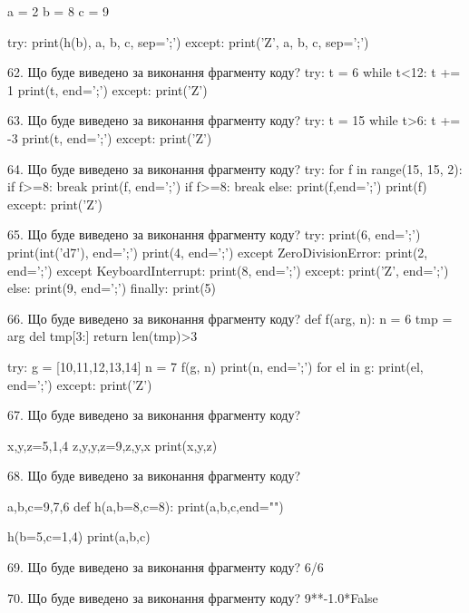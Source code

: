 \documentclass[11pt]{article}
\begin{document}
a = 2
b = 8
c = 9

try:
    print(h(b), a, b, c, sep=';')
except:
    print('Z', a, b, c, sep=';')


62. Що буде виведено за виконання фрагменту коду?
try:
    t = 6
    while t<12:
        t += 1
    print(t, end=';')
except:
    print('Z')


63. Що буде виведено за виконання фрагменту коду?
try:
    t = 15
    while t>6:
        t += -3
    print(t, end=';')
except:
    print('Z')


64. Що буде виведено за виконання фрагменту коду?
try:
    for f in range(15, 15, 2):
        if f>=8:
            break
        print(f, end=';')
        if f>=8:
            break
    else:
        print(f,end=';')
    print(f)
except:
    print('Z')


65. Що буде виведено за виконання фрагменту коду?
try:
    print(6, end=';')
    print(int('d7'), end=';')
    print(4, end=';')
except ZeroDivisionError:
    print(2, end=';')
except KeyboardInterrupt:
    print(8, end=';')
except:
    print('Z', end=';')
else:
    print(9, end=';')
finally:
    print(5)


66. Що буде виведено за виконання фрагменту коду?
def f(arg, n):
    n = 6
    tmp = arg
    del tmp[3:]
    return len(tmp)>3

try:
    g = [10,11,12,13,14]
    n = 7
    f(g, n)
    print(n, end=';')
    for el in g:
        print(el, end=';')
except:
    print('Z')


67. Що буде виведено за виконання фрагменту коду?

x,y,z=5,1,4
z,y,y,z=9,z,y,x
print(x,y,z)


68. Що буде виведено за виконання фрагменту коду?

a,b,c=9,7,6
def h(a,b=8,c=8):
    print(a,b,c,end="")

h(b=5,c=1,4)
print(a,b,c)



69. Що буде виведено за виконання фрагменту коду?
6/6%

70. Що буде виведено за виконання фрагменту коду?
9**-1.0*False
\end{document}
